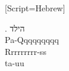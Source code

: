 
\newfontfamily{}[Script=Hebrew]

\GlossRTL
\GlossMorphAlign

\ex. \gl הילד \\
         Pa-Qqqqqqqqq \\
         Rrrrrrrrr-ss \\
         ta-uu \\
     \endgl


